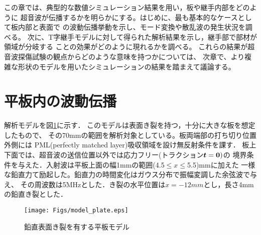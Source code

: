 この章では、典型的な数値シミュレーション結果を用い，板や継手内部をどのように
超音波が伝播するかを明らかにする。はじめに、最も基本的なケースとして板内部と表面で
の波動伝播挙動を示し、モード変換や散乱波の発生状況を調べる。
次に、T字継手モデルに対して得られた解析結果を示し，継手部で部材が領域が分岐する
ことの効果がどのように現れるかを調べる。
これらの結果が超音波探傷試験の観点からどのような意味を持つかについては、
次章で、より複雑な形状のモデルを用いたシミュレーションの結果を踏まえて議論する。
\section{平板内の波動伝播}
解析モデルを図\ref{fig:fig3_00}に示す．
このモデルは表面き裂を持つ，十分に大きな板を想定したもので、
その70mmの範囲を解析対象としている。板両端部の打ち切り位置外側には
PML(perfectly matched layer)吸収領域を設け無反射条件を課す．
板上下面では、超音波の送信位置以外では応力フリー(トラクション$\mbox{\boldmath $t$}=\mbox{\boldmath $0$})$の
境界条件を与えた．入射波は平板上面の幅1mmの範囲(4.5$\leq x \leq $5.5)mmに加えた
一様な鉛直力て励起した。鉛直力の時間変化はガウス分布で振幅変調した余弦波で与え、
その周波数は5MHzとした．き裂の水平位置は$x=-12mm$とし，長さ4mmの鉛直き裂とした．
\begin{figure}[h]
	\begin{center}
	\texttt{[image: Figs/model\_plate.eps]} 
	\end{center}
	\caption{
		鉛直表面き裂を有する平板モデル
	} 
	\label{fig:fig3_00}
\end{figure}
